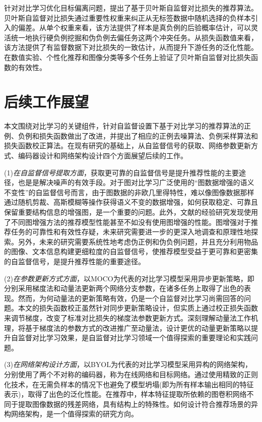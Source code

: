 针对对比学习优化目标偏离问题，提出了基于贝叶斯自监督对比损失的推荐算法。贝叶斯自监督对比损失通过重要性权重来纠正从无标签数据中随机选择的负样本引入的偏差。从单个权重来看，该方法提供了样本是真负例的后验概率估计，可以灵活统一地执行硬负例挖掘和伪负例去偏任务这两个冲突任务。从损失函数值来看，该方法提供了有监督数据下对比损失的一致估计，从而提升下游任务的泛化性能。在数值实验、个性化推荐和图像分类等多个任务上验证了贝叶斯自监督对比损失函数的有效性。

\section{后续工作展望}
\label{sec:conclusion}
本文围绕对比学习的关键组件，针对自监督设置下基于对比学习的推荐算法的正例、负例和损失函数做出了改进，并提出了相应的正例去噪算法、负例采样算法和损失函数校正算法。在现有研究的基础上，从自监督信号的获取、网络参数更新方式、编码器设计和网络架构设计四个方面展望后续的工作。

(1)\textit{在自监督信号提取方面}，获取更可靠的自监督信号是提升推荐性能的主要途径，也是是解决噪声的有效手段。对于图对比学习广泛使用的“图数据增强的语义不变性”的自监督信号而言，由于图数据的非欧几里得特性，难以像图像数据那样通过随机剪裁、高斯模糊等操作获得语义不变的数据增强，如何获取稳定、可靠且保留重要结构信息的增强图，是一个重要的问题。此外，文献\cite{yu2022graph}的经验研究发现使用了不同图增强方法的推荐模型性能甚至不如没有使用图增强的性能。图增强对于推荐任务的可靠性和有效性存疑，未来研究需要进一步的更深入地调查和原理性地探索。另外，未来的研究需要系统性地考虑伪正例和伪负例问题，并且充分利用物品的图像、文本信息构建更细粒度的自监督信号，使推荐模型受益于更可靠和更密集的自监督信号，是提升推荐性能的重要途径。

(2)\textit{在参数更新方式方面}，以MOCO\cite{He:2020:CVPR}为代表的对比学习模型采用异步更新策略，即分别采用梯度法和动量法更新两个网络分支参数，在诸多任务上取得了出色的表现。然而，为何动量法的更新策略有效，仍是一个自监督对比学习尚需回答的问题。本文的损失函数校正虽然针对同步更新策略设计，但实质上通过校正损失函数来调节梯度，改变了标准对比损失的梯度法参数更新方式。深刻理解动量法工作机理，将基于梯度法的参数方式的改进推广至动量法，设计更优的动量更新策略以提升自监督对比学习效果，是自监督对比学习领域一个值得探索的重要理论和实践问题。

(3)\textit{在网络架构设计方面}，以BYOL\cite{BYOL:2020:NIPS}为代表的对比学习模型采用异构的网络架构，分别使用了两个不对称的编码器，称为在线网络和目标网络。通过使用精致的正则化技术，在无需负样本的情况下也避免了模型坍塌(即为所有样本输出相同的特征表示)，取得了出色的泛化性能。在推荐中，样本特征提取所依赖的图卷积网络不同于提取图像数据的残差网络，具有结构上的特殊性。如何设计符合推荐场景的异构网络架构，是一个值得探索的研究方向。


